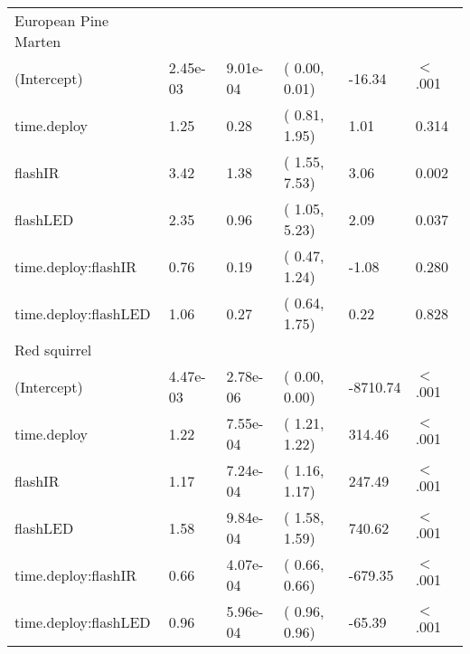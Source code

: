 \begin{table}[ht]
\begin{tabular}{llllll}
  European Pine Marten &  &  &  &  &        \\ 
  (Intercept) & 2.45e-03 & 9.01e-04 & ( 0.00,  0.01) & -16.34 & $<$ .001 \\ 
  time.deploy & 1.25 & 0.28 & ( 0.81,  1.95) & 1.01 & 0.314  \\ 
  flashIR & 3.42 & 1.38 & ( 1.55,  7.53) & 3.06 & 0.002  \\ 
  flashLED & 2.35 & 0.96 & ( 1.05,  5.23) & 2.09 & 0.037  \\ 
  time.deploy:flashIR & 0.76 & 0.19 & ( 0.47,  1.24) & -1.08 & 0.280  \\ 
  time.deploy:flashLED & 1.06 & 0.27 & ( 0.64,  1.75) & 0.22 & 0.828  \\ 
  Red squirrel &  &  &  &  &        \\ 
  (Intercept) & 4.47e-03 & 2.78e-06 & ( 0.00,  0.00) & -8710.74 & $<$ .001 \\ 
  time.deploy & 1.22 & 7.55e-04 & ( 1.21,  1.22) & 314.46 & $<$ .001 \\ 
  flashIR & 1.17 & 7.24e-04 & ( 1.16,  1.17) & 247.49 & $<$ .001 \\ 
  flashLED & 1.58 & 9.84e-04 & ( 1.58,  1.59) & 740.62 & $<$ .001 \\ 
  time.deploy:flashIR & 0.66 & 4.07e-04 & ( 0.66,  0.66) & -679.35 & $<$ .001 \\ 
  time.deploy:flashLED & 0.96 & 5.96e-04 & ( 0.96,  0.96) & -65.39 & $<$ .001 \\ 
   \hline
\end{tabular}
\end{table}
